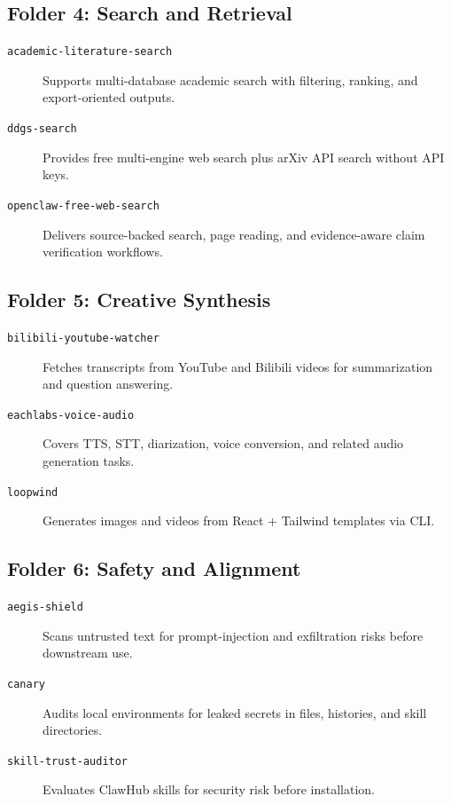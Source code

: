 \subsection{Folder 4: Search and Retrieval}
\begin{description}
\item[\texttt{academic-literature-search}] Supports multi-database academic search with filtering, ranking, and export-oriented outputs.
\item[\texttt{ddgs-search}] Provides free multi-engine web search plus arXiv API search without API keys.
\item[\texttt{openclaw-free-web-search}] Delivers source-backed search, page reading, and evidence-aware claim verification workflows.
\end{description}

\subsection{Folder 5: Creative Synthesis}
\begin{description}
\item[\texttt{bilibili-youtube-watcher}] Fetches transcripts from YouTube and Bilibili videos for summarization and question answering.
\item[\texttt{eachlabs-voice-audio}] Covers TTS, STT, diarization, voice conversion, and related audio generation tasks.
\item[\texttt{loopwind}] Generates images and videos from React + Tailwind templates via CLI.
\end{description}

\subsection{Folder 6: Safety and Alignment}
\begin{description}
\item[\texttt{aegis-shield}] Scans untrusted text for prompt-injection and exfiltration risks before downstream use.
\item[\texttt{canary}] Audits local environments for leaked secrets in files, histories, and skill directories.
\item[\texttt{skill-trust-auditor}] Evaluates ClawHub skills for security risk before installation.
\end{description}
